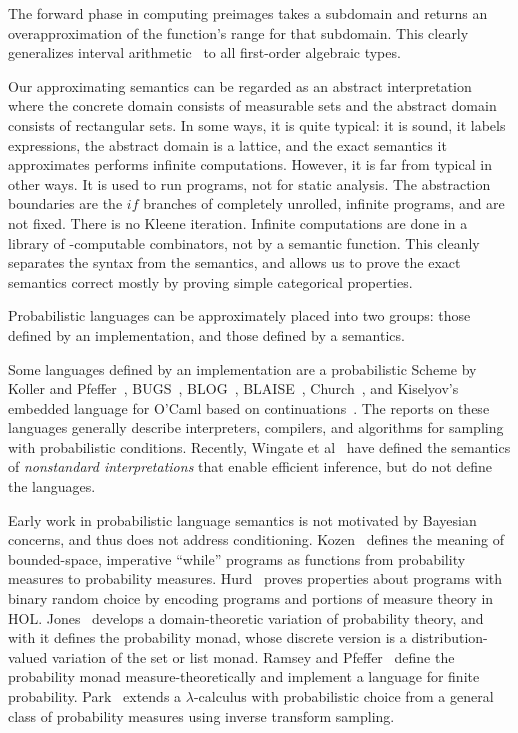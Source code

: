 The forward phase in computing preimages takes a subdomain and returns an overapproximation of the function's range for that subdomain.
This clearly generalizes interval arithmetic~\cite{cit:kearfott-1996eb-interval} to all first-order algebraic types.

Our approximating semantics can be regarded as an abstract interpretation~\cite{cit:cousot-1977popl-abstract-interpretation} where the concrete domain consists of measurable sets and the abstract domain consists of rectangular sets.
In some ways, it is quite typical: it is sound, it labels expressions, the abstract domain is a lattice, and the exact semantics it approximates performs infinite computations.
However, it is far from typical in other ways.
It is used to run programs, not for static analysis.
The abstraction boundaries are the $if$ branches of completely unrolled, infinite programs, and are not fixed.
There is no Kleene iteration.
Infinite computations are done in a library of \lzfclang-computable combinators, not by a semantic function.
This cleanly separates the syntax from the semantics, and allows us to prove the exact semantics correct mostly by proving simple categorical properties.

Probabilistic languages can be approximately placed into two groups: those defined by an implementation, and those defined by a semantics.

Some languages defined by an implementation are a probabilistic Scheme by Koller and Pfeffer~\cite{cit:koller-1997aaai-bayes-programs-short}, BUGS~\cite{cit:winbugs-language-short}, BLOG~\cite{cit:blog-language-short}, BLAISE~\cite{cit:blaise-language}, Church~\cite{cit:church-language-short}, and Kiselyov's embedded language for O'Caml based on continuations~\cite{cit:kiselyov-2008uai-monolingual}.
The reports on these languages generally describe interpreters, compilers, and algorithms for sampling with probabilistic conditions.
Recently, Wingate et al~\cite{cit:wingate-2011ais-lightweight,cit:wingate-2011nips-nonstandard} have defined the semantics of \emph{nonstandard interpretations} that enable efficient inference, but do not define the languages.

Early work in probabilistic language semantics is not motivated by Bayesian concerns, and thus does not address conditioning.
Kozen~\cite{cit:kozen-1979fcs-prob-programs-short} defines the meaning of bounded-space, imperative ``while'' programs as functions from probability measures to probability measures.
Hurd~\cite{cit:hurd-2002thesis} proves properties about programs with binary random choice by encoding programs and portions of measure theory in HOL.
Jones~\cite{cit:jones-1990thesis} develops a domain-theoretic variation of probability theory, and with it defines the probability monad, whose discrete version is a distribution-valued variation of the set or list monad.
Ramsey and Pfeffer~\cite{cit:ramsey-2002popl-stochastic-short} define the probability monad measure-theoretically and implement a language for finite probability.
Park~\cite{cit:park-2008toplas-prob} extends a $\lambda$-calculus with probabilistic choice from a general class of probability measures using inverse transform sampling.

